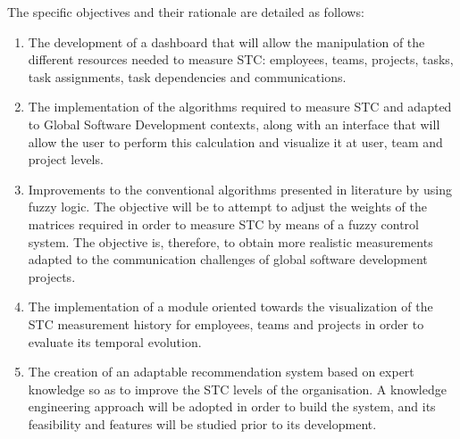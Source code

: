 The specific objectives and their rationale are detailed as follows:

\begin{enumerate}
\item The development of a dashboard that will allow the manipulation of the different resources needed to measure STC: employees, teams, projects, tasks, task assignments, task dependencies and communications.
\item The implementation of the algorithms required to measure STC and adapted to Global Software Development contexts, along with an interface that will allow the user to perform this calculation and visualize it at user, team and project levels.
\item Improvements to the conventional algorithms presented in literature by using fuzzy logic. The objective will be to attempt to adjust the weights of the matrices required in order to measure STC by means of a fuzzy control system. The objective is, therefore, to obtain more realistic measurements adapted to the communication challenges of global software development projects.
\item The implementation of a module oriented towards the visualization of the STC measurement history for employees, teams and projects in order to evaluate its temporal evolution.
\item The creation of an adaptable recommendation system based on expert knowledge so as to improve the STC levels of the organisation. A knowledge engineering approach will be adopted in order to build the system, and its feasibility and features will be studied prior to its development.
\end{enumerate}